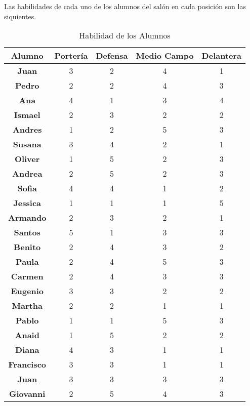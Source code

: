 \documentclass[10pt,letterpaper,twoside,openright]{article}
\begin{document}
	Las habilidades de cada uno de los alumnos del salón en cada posición son las siquientes.
	
	\begin{table}[h!]
	\centering
	\begin{adjustbox}{max width=\textwidth}
	\begin{tabular}{c||cccc}
	\textbf{Alumno} & \textbf{Portería} & \textbf{Defensa} &\textbf{Medio Campo} & \textbf{Delantera} \\ 
	\hline	\hline 
	\textbf{Juan} & 3 & 2 & 4 & 1 \\ 
	\hline 
	\textbf{Pedro} & 2 & 2 & 4 & 3 \\ 
	\hline 
	\textbf{Ana} & 4 & 1 & 3 & 4 \\ 
	\hline 
	\textbf{Ismael} & 2 & 3 & 2 & 2 \\ 
	\hline 
	\textbf{Andres} & 1 & 2 & 5 & 3 \\ 
	\hline 
	\textbf{Susana} & 3 & 4 & 2 & 1 \\ 
	\hline 
	\textbf{Oliver} & 1 & 5 & 2 & 3 \\ 
	\hline 
	\textbf{Andrea} & 2 & 5 & 2 & 3 \\ 
	\hline 
	\textbf{Sofia} & 4 & 4 & 1 & 2 \\ 
	\hline 
	\textbf{Jessica} & 1 & 1 & 1 & 5 \\ 
	\hline 
	\textbf{Armando} & 2 & 3 & 2 & 1 \\ 
	\hline 
	\textbf{Santos} & 5 & 1 & 3 & 3 \\ 
	\hline 
	\textbf{Benito} & 2 & 4 & 3 & 2 \\ 
	\hline 
	\textbf{Paula} & 2 & 4 & 5 & 3 \\ 
	\hline 
	\textbf{Carmen} & 2 & 4 & 3 & 3 \\ 
	\hline 
	\textbf{Eugenio} & 3 & 3 & 2 & 2 \\ 
	\hline 
	\textbf{Martha} & 2 & 2 & 1 & 1 \\ 
	\hline 
	\textbf{Pablo} & 1 & 1 & 5 & 3 \\ 
	\hline 
	\textbf{Anaid} & 1 & 5 & 2 & 2 \\ 
	\hline 
	\textbf{Diana} & 4 & 3 & 1 & 1 \\ 
	\hline 
	\textbf{Francisco} & 3 & 3 & 1 & 1 \\ 
	\hline 
	\textbf{Juan} & 3 & 3 & 3 & 3 \\ 
	\hline 
	\textbf{Giovanni} & 2 & 5 & 4 & 3 \\ 
	\hline 
	\end{tabular} 
	\end{adjustbox}
	\caption{Habilidad de los Alumnos}
	\label{tab:habilidad}
	\end{table}
	
\end{document}
